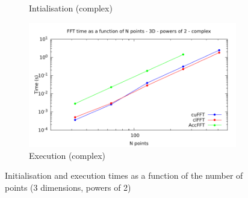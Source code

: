 \documentclass[12pt, a4paper]{article}
\begin{document}
\begin{figure}[H]
\begin{subfigure}{.5\textwidth}
\caption{Intialisation (complex)}
\label{FFTPOW23DCI}
\end{subfigure}%
\begin{subfigure}{.5\textwidth}
\centering
\includegraphics[width=.9\linewidth]{graphs/fft-3d-pow2-c-exec.pdf}
\caption{Execution (complex)}
\label{FFTPOW23DCE}
\end{subfigure}
\caption{Initialisation and execution times as a function of the number of points (3 dimensions, powers of 2)}
\label{FFTPOW23D}
\end{figure}
\end{document}
